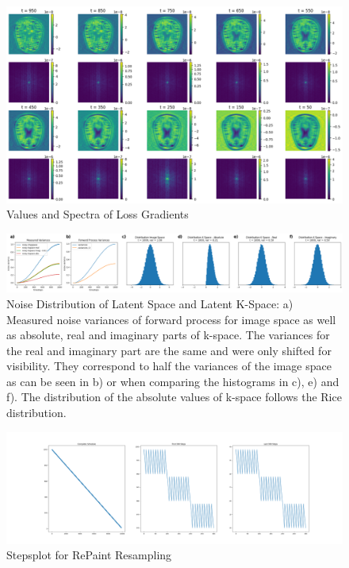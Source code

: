 \begin{figure}[h]
    \centering
    \includegraphics[width=.66\textwidth]{images/gradientspectra.png}
    \caption[Values and Spectra of Loss Gradients]{Values and Spectra of Loss Gradients}
    \label{fig:lossgradients}
\end{figure}

\begin{figure}[h]
    \centering
    \includegraphics[width=\textwidth]{images/kspacedistribution.png}
    \caption[Noise Distribution of Latent K-Space]{Noise Distribution of Latent Space and Latent K-Space: a) Measured noise variances of forward process for image space as well as absolute, real and imaginary parts of k-space. The variances for the real and imaginary part are the same and were only shifted for visibility. They correspond to half the variances of the image space as can be seen in b) or when comparing the histograms in c), e) and f). The distribution of the absolute values of k-space follows the Rice distribution.}
    \label{fig:kspacedistribution}
\end{figure}

\begin{figure}[h]
    \centering
    \includegraphics[width=\textwidth]{images/stepsplot.png}
    \caption[Stepsplot for RePaint Resampling]{Stepsplot for RePaint Resampling}
    \label{fig:stepsplot}
\end{figure}